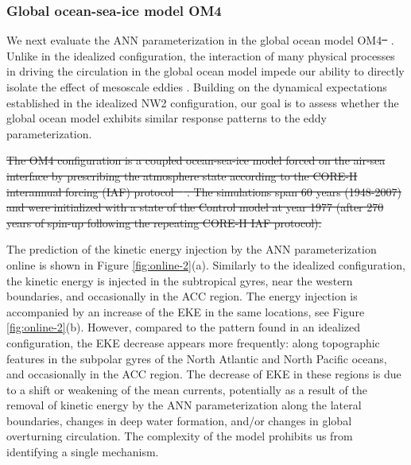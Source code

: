 \documentclass[draft]{agujournal2019}
\providecommand{\DIFdel}[1]{{\protect\color{red}\sout{#1}}}                      %
\providecommand{\DIFdelbegin}{} %
\providecommand{\DIFdelend}{} %
\begin{document}
\subsubsection{Global ocean-sea-ice model OM4}
We next evaluate the ANN parameterization in the global ocean model OM4\DIFdelbegin \DIFdel{\mbox{%
\cite{adcroft2019gfdl}}\hskip0pt%
}\DIFdelend . Unlike in the idealized configuration, the interaction of many physical processes in driving the circulation in the global ocean model impede our ability to directly isolate the effect of mesoscale eddies \cite{ferrari2009ocean, levy2010modifications}. Building on the dynamical expectations established in the idealized NW2 configuration, our goal is to assess whether the global ocean model exhibits similar response patterns to the eddy parameterization.

\DIFdelbegin \DIFdel{The OM4 configuration is a coupled ocean-sea-ice model forced on the air-sea interface by prescribing the atmosphere state according to the CORE-II interannual forcing (IAF) protocol \mbox{%
\cite{large2009global}}\hskip0pt%
. The simulations span 60 years (1948-2007) and were initialized with a state of the Control model at year 1977 (after 270 years of spin-up following the repeating CORE-II IAF protocol).
}%

\DIFdelend %
The prediction of the kinetic energy injection by the ANN parameterization online is shown in Figure \ref{fig:online-2}(a). Similarly to the idealized configuration, the kinetic energy is injected in the subtropical gyres, %
near the western boundaries, and occasionally in the ACC region. The energy injection is accompanied by an increase of the EKE in the same locations, see Figure \ref{fig:online-2}(b). However, compared to the pattern found in an idealized configuration, the EKE decrease appears more frequently: along topographic features in the subpolar gyres of the North Atlantic and North Pacific oceans, and occasionally in the ACC region. The decrease of EKE in these regions is due to a shift or weakening of the mean currents, potentially as a result of the removal of kinetic energy by the ANN parameterization along the lateral boundaries, changes in deep water formation, and/or changes in global overturning circulation. The complexity of the model prohibits us from identifying a single mechanism. 
\end{document}
